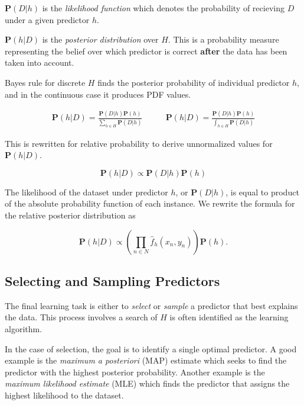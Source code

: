 \documentclass[twoside]{article}
\begin{document}
\(\mathbf{P}(D|h)\) is the \textit{likelihood function} which denotes the probability of recieving \(D\) under a given predictor \(h\). 

\(\mathbf{P}(h|D)\) is the \textit{posterior distribution} over \(H\). This is a probability measure representing the belief over which predictor is correct \textbf{after} the data has been taken into account.

Bayes rule for discrete \(H\) finds the posterior probability of individual predictor \(h\), and in the continuous case it produces PDF values.

\begin{align}
\mathbf{P}(h|D)=\frac{\mathbf{P}(D|h)\mathbf{P}(h)}{\sum_{h \in H}\mathbf{P}(D|h)} &
\qquad\mathbf{P}(h|D)=\frac{\mathbf{P}(D|h)\mathbf{P}(h)}{\int_{h \in H}\mathbf{P}(D|h)}
\end{align}

This is rewritten for relative probability to derive unnormalized values for \(\mathbf{P}(h|D)\).

\begin{equation}
\label{eq:bayes}
\mathbf{P}(h|D)\propto\mathbf{P}(D|h)\mathbf{P}(h)
\end{equation}

The likelihood of the dataset under predictor \(h\), or \(\mathbf{P}(D|h)\), is equal to product of the absolute probability function of each instance. We rewrite the formula for the relative posterior distribution as

\begin{equation}
\label{eq:bayes_likelihood_expanded}
\mathbf{P}(h|D)\propto \left( \prod_{n \in N} \hat{f}_h(x_n,y_n) \right) \mathbf{P}(h).
\end{equation}

\subsection{Selecting and Sampling Predictors}

The final learning task is either to \textit{select} or \textit{sample} a predictor that best explains the data. This process involves a search of \(H\) is often identified as the learning algorithm.

In the case of selection, the goal is to identify a single optimal predictor. A good example is the \textit{maximum a posteriori} (MAP) estimate which seeks to find the predictor with the highest posterior probability. Another example is the \textit{maximum likelihood estimate} (MLE) which finds the predictor that assigns the highest likelihood to the dataset.
\end{document}
